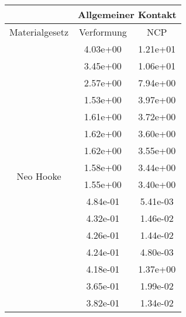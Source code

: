 \begin{table} 
\centering 
\begin{tabular}{c|cc|} 
\cline{2-3} 
 & \multicolumn{2}{|c|}{Allgemeiner Kontakt} \\ 
\hline 
\multicolumn{1}{|c|}{Materialgesetz} & \multicolumn{1}{c|}{Verformung} & \multicolumn{1}{c|}{NCP} \\ 
\hline 
\multicolumn{1}{|c|}{\multirow{101}{*}{Neo Hooke}} &\multicolumn{1}{|c|}{  4.03e+00} & \multicolumn{1}{|c|}{  1.21e+01} \\ 
\multicolumn{1}{|c|}{} & \multicolumn{1}{|c|}{  3.45e+00} & \multicolumn{1}{|c|}{  1.06e+01} \\ 
\multicolumn{1}{|c|}{} & \multicolumn{1}{|c|}{  2.57e+00} & \multicolumn{1}{|c|}{  7.94e+00} \\ 
\multicolumn{1}{|c|}{} & \multicolumn{1}{|c|}{  1.53e+00} & \multicolumn{1}{|c|}{  3.97e+00} \\ 
\multicolumn{1}{|c|}{} & \multicolumn{1}{|c|}{  1.61e+00} & \multicolumn{1}{|c|}{  3.72e+00} \\ 
\multicolumn{1}{|c|}{} & \multicolumn{1}{|c|}{  1.62e+00} & \multicolumn{1}{|c|}{  3.60e+00} \\ 
\multicolumn{1}{|c|}{} & \multicolumn{1}{|c|}{  1.62e+00} & \multicolumn{1}{|c|}{  3.55e+00} \\ 
\multicolumn{1}{|c|}{} & \multicolumn{1}{|c|}{  1.58e+00} & \multicolumn{1}{|c|}{  3.44e+00} \\ 
\multicolumn{1}{|c|}{} & \multicolumn{1}{|c|}{  1.55e+00} & \multicolumn{1}{|c|}{  3.40e+00} \\ 
\multicolumn{1}{|c|}{} & \multicolumn{1}{|c|}{  4.84e-01} & \multicolumn{1}{|c|}{  5.41e-03} \\ 
\multicolumn{1}{|c|}{} & \multicolumn{1}{|c|}{  4.32e-01} & \multicolumn{1}{|c|}{  1.46e-02} \\ 
\multicolumn{1}{|c|}{} & \multicolumn{1}{|c|}{  4.26e-01} & \multicolumn{1}{|c|}{  1.44e-02} \\ 
\multicolumn{1}{|c|}{} & \multicolumn{1}{|c|}{  4.24e-01} & \multicolumn{1}{|c|}{  4.80e-03} \\ 
\multicolumn{1}{|c|}{} & \multicolumn{1}{|c|}{  4.18e-01} & \multicolumn{1}{|c|}{  1.37e+00} \\ 
\multicolumn{1}{|c|}{} & \multicolumn{1}{|c|}{  3.65e-01} & \multicolumn{1}{|c|}{  1.99e-02} \\ 
\multicolumn{1}{|c|}{} & \multicolumn{1}{|c|}{  3.82e-01} & \multicolumn{1}{|c|}{  1.34e-02} \\ 

\end{tabular}
\end{table}

